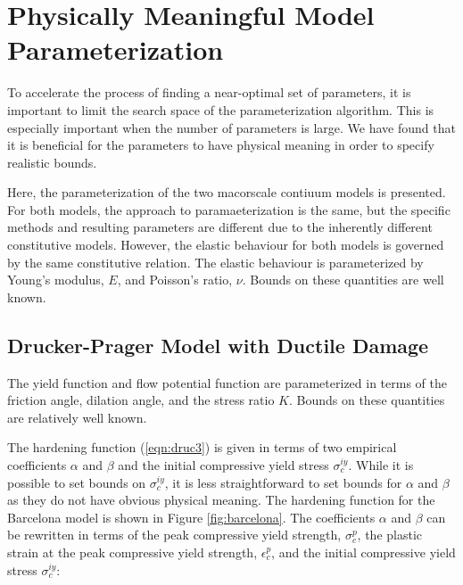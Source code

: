 \section{Physically Meaningful Model Parameterization}

To accelerate the process of finding a near-optimal set of parameters, it is important to limit the search space of the parameterization algorithm. This is especially important when the number of parameters is large. We have found that it is beneficial for the parameters to have physical meaning in order to specify realistic bounds.

Here, the parameterization of the two macorscale contiuum models is presented. For both models, the approach to paramaeterization is the same, but the specific methods and resulting parameters are different due to the inherently different constitutive models. However, the elastic behaviour for both models is governed by the same constitutive relation. The elastic behaviour is parameterized by Young's modulus, $E$, and Poisson's ratio, $\nu$. Bounds on these quantities are well known. 

\subsection{Drucker-Prager Model with Ductile Damage}

The yield function and flow potential function are parameterized in terms of the friction angle, dilation angle, and the stress ratio $K$. Bounds on these quantities are relatively well known.

The hardening function (\ref{eqn:druc3}) is given in terms of two empirical coefficients $\alpha$ and $\beta$ and the initial compressive yield stress $\sigma_c^{iy}$.  While it is possible to set bounds on $\sigma_c^{iy}$, it is less straightforward to set bounds for $\alpha$ and $\beta$ as they do not have obvious physical meaning. The hardening function for the Barcelona model is shown in Figure \ref{fig:barcelona}. The coefficients $\alpha$ and $\beta$ can be rewritten in terms of the peak compressive yield strength, $\sigma_{c}^{p}$, the plastic strain at the peak compressive yield strength, $\epsilon_c^{p}$, and the initial compressive yield stress $\sigma_c^{iy}$:

